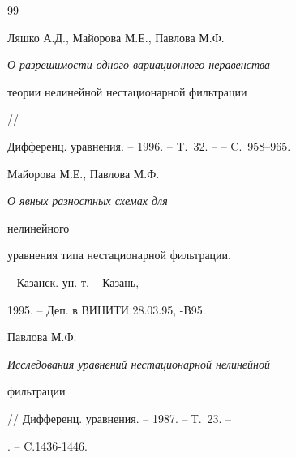 \begin{thebibliography}{99}




Ляшко А.Д.,  Майорова М.Е., Павлова М.Ф.


{\em О разрешимости одного вариационного неравенства


 теории нелинейной нестационарной фильтрации} //


 Дифференц. уравнения. -- 1996. -- T.~32. --  -- C.~958--965.


























Майорова М.Е., Павлова М.Ф. {\em О явных разностных схемах для


нелинейного


уравнения типа нестационарной фильтрации.} -- Казанск. ун.-т. -- Казань,


1995. -- Деп. в ВИНИТИ 28.03.95, -В95.















Павлова М.Ф. {\em Исследования уравнений нестационарной нелинейной


фильтрации} // Дифференц. уравнения. -- 1987. -- Т.~23. -- 


. -- C.1436-1446.







\end{thebibliography}
